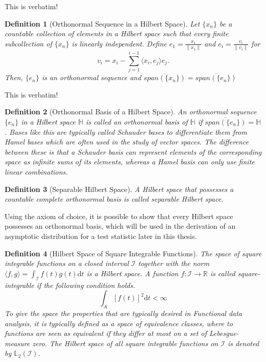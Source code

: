 \documentclass[12pt, a4paper]{article}
\theoremstyle{MAstyle} \newtheorem{assumption}{Assumption}[section]
\theoremstyle{MAstyle} \newtheorem{definition}{Definition}[section]
\begin{document}
			{\color{red} This is verbatim!}
			\begin{definition}[Orthonormal Sequence in a Hilbert Space]
				Let $\{x_n\}$ be a countable collection of elements in a Hilbert space such that every finite subcollection of $\{x_n\}$ is linearly independent. Define $e_1 = \frac{x_1}{\| x_1 \|}$ and $e_i = \frac{v_i}{\| v_i \|}$ for 
				$$v_i = x_i - \sum_{j = 1}^{i - 1}\langle x_i, e_j\rangle e_j.$$
				Then, $\{e_n\}$ is an orthonormal sequence and $\overline{{\textit{span}\left(\{x_n\}\right)}} = \overline{{\textit{span}\left(\{e_n\}\right)}}$
			\end{definition}
		
			{\color{red} This is verbatim!}
			\begin{definition}[Orthonormal Basis of a Hilbert Space]
				An orthonormal sequence $\{e_n\}$ in a Hilbert space $\mathbb{H}$ is called an orthonormal basis of $\mathbb{H}$ if $\overline{{\textit{span}\left(\{e_n\}\right)}} = \mathbb{H}$. Bases like this are typically called Schauder bases to differentiate them from Hamel bases which are often used in the study of vector spaces. The difference between these is that a Schauder basis can represent elements of the corresponding space as infinite sums of its elements, whereas a Hamel basis can only use finite linear combinations.
			\end{definition}
		
			\begin{definition}[Separable Hilbert Space]
				A Hilbert space that possesses a countable complete orthonormal basis is called separable Hilbert space.
			\end{definition}
			Using the axiom of choice, it is possible to show that every Hilbert space possesses an orthonormal basis, which will be used in the derivation of an asymptotic distribution for a test statistic later in this thesis.
		
			\begin{definition}[Hilbert Space of Square Integrable Functions]
				
				The space of square integrable functions on a closed interval $\mathcal{I}$ together with the norm $\langle f,g\rangle = \int_{\mathcal{I}} f(t)g(t) \mathrm{d}t$ is a Hilbert space.
				A function $f: \mathcal{I} \rightarrow \mathbb{R}$ is called square-integrable if the following condition holds.
				\begin{equation}
					\int_{A} \left[f(t)\right]^2\mathrm{d}t < \infty
				\end{equation}
				To give the space the properties that are typically desired in Functional data analysis, it is typically defined as a space of equivalence classes, where to functions are seen as equivalent if they differ at most on a set of Lebesgue-measure zero. The Hilbert space of all square integrable functions on $\mathcal{I}$ is denoted by $\mathbb{L}_2(\mathcal{I})$.
			\end{definition}
			
\end{document}
